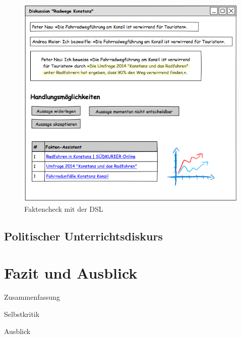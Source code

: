 \documentclass[11pt,a4paper,bibtotocnumbered]{scrreprt}
\begin{document}
\begin{figure}[htbp]
\centering
\includegraphics[width=1\textwidth]{img/faktencheck.png}
\caption{Faktencheck mit der DSL}
\label{faktencheck}
\end{figure}



\section{Politischer Unterrichtsdiskurs} %



\chapter{Fazit und Ausblick} %


Zusammenfassung

Selbstkritik

Ausblick

 
\end{document}
